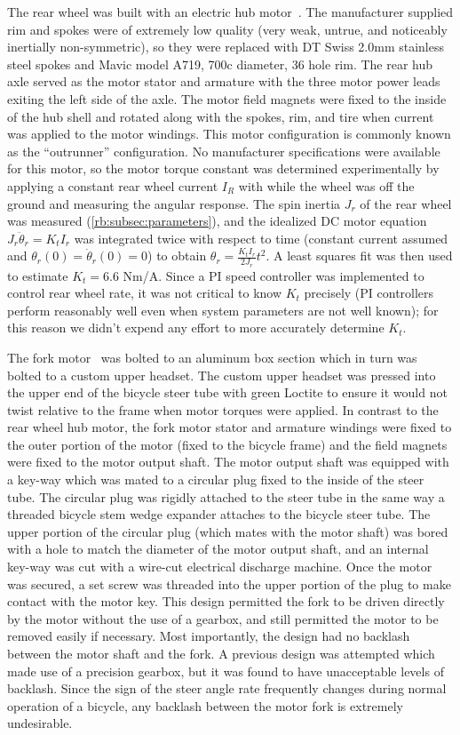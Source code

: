 The rear wheel was built with an electric hub motor~\cite{AmpedBikes}. The
manufacturer supplied rim and spokes were of extremely low quality (very weak,
untrue, and noticeably inertially non-symmetric), so they were replaced with DT
Swiss 2.0mm stainless steel spokes and Mavic model A719, 700c diameter, 36 hole
rim. The rear hub axle served as the motor stator and armature with the three
motor power leads exiting the left side of the axle. The motor field magnets
were fixed to the inside of the hub shell and rotated along with the spokes,
rim, and tire when current was applied to the motor windings. This motor
configuration is commonly known as the ``outrunner'' configuration. No
manufacturer specifications were available for this motor, so the motor torque
constant was determined experimentally by applying a constant rear wheel
current $I_R$ with while the wheel was off the ground and measuring the angular
response. The spin inertia $J_r$ of the rear wheel was measured
(\autoref{rb:subsec:parameters}), and the idealized DC motor equation
$J_r\ddot{\theta}_r = K_t I_r$ was integrated twice with respect to time
(constant current assumed and $\theta_r(0)=\dot{\theta}_r(0) = 0$) to obtain
$\theta_r = \frac{K_t I_r}{2J_r}t^2$. A least squares fit was then used to
estimate $K_t=6.6$ Nm/A. Since a PI speed controller was implemented to control
rear wheel rate, it was not critical to know $K_t$ precisely (PI controllers
perform reasonably well even when system parameters are not well known); for
this reason we didn't expend any effort to more accurately determine $K_t$.

The fork motor~\cite{TeknicM3441} was bolted to an aluminum box section which
in turn was bolted to a custom upper headset. The custom upper headset was
pressed into the upper end of the bicycle steer tube with green Loctite to
ensure it would not twist relative to the frame when motor torques were
applied. In contrast to the rear wheel hub motor, the fork motor stator and
armature windings were fixed to the outer portion of the motor (fixed to the
bicycle frame) and the field magnets were fixed to the motor output shaft.  The
motor output shaft was equipped with a key-way which was mated to a circular
plug fixed to the inside of the steer tube. The circular plug was rigidly
attached to the steer tube in the same way a threaded bicycle stem wedge
expander attaches to the bicycle steer tube. The upper portion of the circular
plug (which mates with the motor shaft) was bored with a hole to match the
diameter of the motor output shaft, and an internal key-way was cut with a
wire-cut electrical discharge machine. Once the motor was secured, a set
screw was threaded into the upper portion of the plug to make contact with the
motor key. This design permitted the fork to be driven directly by the motor
without the use of a gearbox, and still permitted the motor to be removed
easily if necessary. Most importantly, the design had no backlash between the
motor shaft and the fork. A previous design was attempted which made use of a
precision gearbox, but it was found to have unacceptable levels of backlash.
Since the sign of the steer angle rate frequently changes during normal
operation of a bicycle, any backlash between the motor fork is extremely
undesirable.

